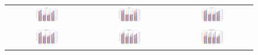 \begin{figure}[h]
\begin{tabular}{c c c}
    \includegraphics[width = 0.3\textwidth]{figures/grad_sign_perturbation/vgg16_eps001.png} &
    \includegraphics[width = 0.3\textwidth]{figures/grad_sign_perturbation/alexnet_eps001.png} &
    \includegraphics[width = 0.3\textwidth]{figures/grad_sign_perturbation/resnet18_eps001.png} \\

    \includegraphics[width = 0.3\textwidth]{figures/grad_sign_perturbation/densenet161_eps001.png} &
    \includegraphics[width = 0.3\textwidth]{figures/grad_sign_perturbation/googlenet_eps001.png} &
    \includegraphics[width = 0.3\textwidth]{figures/grad_sign_perturbation/mobilenetv3large_eps001.png} \\


\end{tabular}
\end{figure}

